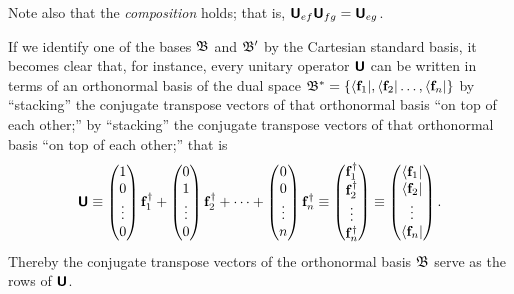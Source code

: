 Note also that the {\em composition} holds; that is, $\textsf{\textbf{U}}_{ef} \textsf{\textbf{U}}_{fg}=  \textsf{\textbf{U}}_{eg}$.



If we
identify one of the bases  ${\frak B}$ and ${\frak B}'$ by the Cartesian standard basis,
it becomes clear that, for instance,
every unitary operator  $\textsf{\textbf{U}}$  can be written in terms of an orthonormal basis  of the dual space
${\frak B}^\ast=\{ \langle {\bf f}_1  \vert     ,   \langle {\bf f}_2  \vert      \ldots ,  \langle {\bf f}_n  \vert     \}$
by ``stacking'' the conjugate transpose vectors of that orthonormal basis ``on top of each other;''
by ``stacking'' the conjugate transpose vectors of that orthonormal basis ``on top of each other;''
that is
\begin{equation}
\textsf{\textbf{U}}
\equiv
\begin{pmatrix}
1\\
0\\
\vdots\\
0
\end{pmatrix} {\bf f}_1^\dagger
+
\begin{pmatrix}
0\\
1\\
\vdots\\
0
\end{pmatrix} {\bf f}_2^\dagger
+
\cdots +
\begin{pmatrix}
0\\
0\\
\vdots\\
n
\end{pmatrix} {\bf f}_n^\dagger
\equiv
\begin{pmatrix}
{\bf f}_1^\dagger\\
{\bf f}_2^\dagger\\
\vdots\\
{\bf f}_n^\dagger
\end{pmatrix}
\equiv
\begin{pmatrix}
\langle {\bf f}_1\vert \\
\langle {\bf f}_2\vert\\
\vdots\\
\langle {\bf f}_n\vert
\end{pmatrix}
.
\end{equation}
Thereby the conjugate transpose vectors of the orthonormal basis  ${\frak B}$ serve as the
rows of $\textsf{\textbf{U}}$.

